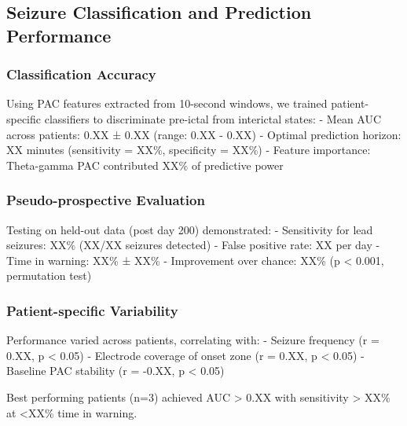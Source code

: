 \subsection{Seizure Classification and Prediction Performance}

\subsubsection{Classification Accuracy}
Using PAC features extracted from 10-second windows, we trained patient-specific classifiers to discriminate pre-ictal from interictal states:
- Mean AUC across patients: 0.XX ± 0.XX (range: 0.XX - 0.XX)
- Optimal prediction horizon: XX minutes (sensitivity = XX\%, specificity = XX\%)
- Feature importance: Theta-gamma PAC contributed XX\% of predictive power

\subsubsection{Pseudo-prospective Evaluation}
Testing on held-out data (post day 200) demonstrated:
- Sensitivity for lead seizures: XX\% (XX/XX seizures detected)
- False positive rate: XX per day
- Time in warning: XX\% ± XX\%
- Improvement over chance: XX\% (p < 0.001, permutation test)

\subsubsection{Patient-specific Variability}
Performance varied across patients, correlating with:
- Seizure frequency (r = 0.XX, p < 0.05)
- Electrode coverage of onset zone (r = 0.XX, p < 0.05)
- Baseline PAC stability (r = -0.XX, p < 0.05)

Best performing patients (n=3) achieved AUC > 0.XX with sensitivity > XX\% at <XX\% time in warning.



